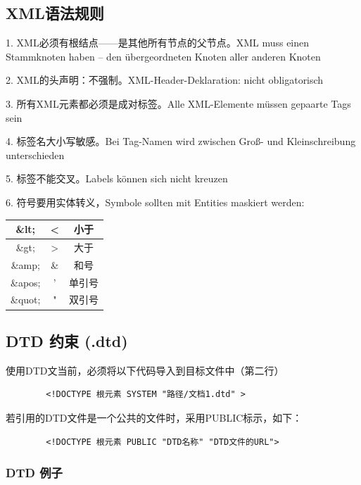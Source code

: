 \documentclass[fontset=windows]{article}
\begin{document}
\subsection{XML语法规则}

1. XML必须有根结点——是其他所有节点的父节点。XML muss einen Stammknoten haben – den übergeordneten Knoten aller anderen Knoten

2. XML的头声明：不强制。XML-Header-Deklaration: nicht obligatorisch

3. 所有XML元素都必须是成对标签。Alle XML-Elemente müssen gepaarte Tags sein

4. 标签名大小写敏感。Bei Tag-Namen wird zwischen Groß- und Kleinschreibung unterschieden

5. 标签不能交叉。Labels können sich nicht kreuzen

6. 符号要用实体转义，Symbole sollten mit Entities maskiert werden:

\begin{center}
\begin{tabular}{|c|c|c|}
	\hline
	\&lt; & < & 小于\\
	\hline
	\&gt; & > & 大于\\
	\hline
	\&amp; & \& & 和号\\
	\hline
	\&apos; & ' & 单引号\\
	\hline
	\&quot; & " & 双引号\\
	\hline
\end{tabular}
\end{center}

\subsection{DTD 约束 (.dtd)}

使用DTD文当前，必须将以下代码导入到目标文件中（第二行）
\begin{center}
	\begin{verbatim}
		<!DOCTYPE 根元素 SYSTEM "路径/文档1.dtd" >
	\end{verbatim}
\end{center}

若引用的DTD文件是一个公共的文件时，采用PUBLIC标示，如下：

\begin{center}
	\begin{verbatim}
		<!DOCTYPE 根元素 PUBLIC "DTD名称" "DTD文件的URL">
	\end{verbatim}
\end{center}

\subsubsection{DTD 例子}
\end{document}
